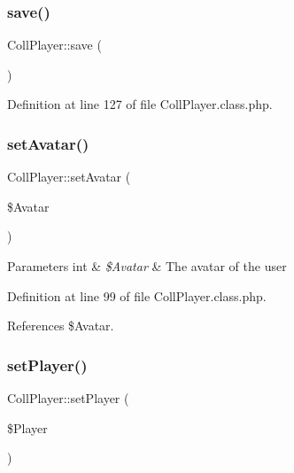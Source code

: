 \mbox{\label{class_coll_player_ad2c746b4ddcc6a6bd72b50f03e27d803}} 
\subsubsection{\texorpdfstring{save()}{save()}}
{\footnotesize\ttfamily Coll\+Player\+::save (\begin{DoxyParamCaption}{ }\end{DoxyParamCaption})}



Definition at line 127 of file Coll\+Player.\+class.\+php.

\mbox{\label{class_coll_player_a0e7661e5d52c9ea11fd8f60841b5a12f}} 
\subsubsection{\texorpdfstring{set\+Avatar()}{setAvatar()}}
{\footnotesize\ttfamily Coll\+Player\+::set\+Avatar (\begin{DoxyParamCaption}\item[{}]{\$\+Avatar }\end{DoxyParamCaption})}


\begin{DoxyParams}[1]{Parameters}
int & {\em \$\+Avatar} & The avatar of the user \\
\hline
\end{DoxyParams}


Definition at line 99 of file Coll\+Player.\+class.\+php.



References \$\+Avatar.

\mbox{\label{class_coll_player_a30f2d614484249893f9e45e9de86219a}} 
\subsubsection{\texorpdfstring{set\+Player()}{setPlayer()}}
{\footnotesize\ttfamily Coll\+Player\+::set\+Player (\begin{DoxyParamCaption}\item[{}]{\$\+Player }\end{DoxyParamCaption})}


